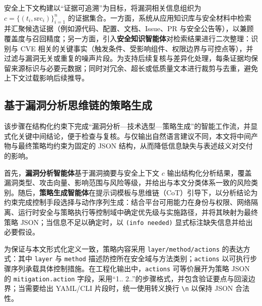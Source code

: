 安全上下文构建以“证据可追溯”为目标，将漏洞相关信息组织为 $c=\{(t_i,\text{src}_i)\}_{i=1}^{n}$ 的证据集合。一方面，系统从应用知识库与安全材料中检索并汇聚候选证据（例如源代码、配置、文档、Issue、PR 与安全公告等），以兼顾覆盖度与召回精度；另一方面，引入\textbf{安全知识智能体}对检索结果进行二次整理：识别与 CVE 相关的关键事实（触发条件、受影响组件、权限边界与可控点等），并过滤与漏洞无关或重复的噪声片段。为支持后续复核与差异化处理，每条证据均保留来源标识与必要元数据；同时对冗余、超长或低质量文本进行裁剪与去重，避免上下文过载影响后续推导。

\subsection{基于漏洞分析思维链的策略生成}

该步骤在结构化约束下完成“漏洞分析—技术选型—策略生成”的智能工作流，并显式化关键中间结论，便于检查与复核。与仅输出自然语言建议不同，本文将中间产物与最终策略均约束为固定的 JSON 结构，从而降低信息缺失与表述歧义对交付的影响。

首先，\textbf{漏洞分析智能体}基于漏洞摘要与安全上下文 $c$ 输出结构化分析结果，覆盖漏洞类型、攻击向量、影响范围与风险等级，并给出与本文分类体系一致的风险类别。随后，\textbf{策略生成智能体}在提示词模板与思维链（CoT）引导下，以分析结论为约束完成控制手段选择与动作序列生成：结合平台可用能力在身份与权限、网络隔离、运行时安全与策略执行等控制域中确定优先级与实施路径，并将其映射为最终策略 JSON；当信息不足以确定时，以 \texttt{(info needed)} 显式标注缺失信息并给出必要假设。

为保证与本文形式化定义一致，策略内容采用 \texttt{layer/method/actions} 的表达方式：其中 \texttt{layer} 与 \texttt{method} 描述防控所在安全域与方法类别；\texttt{actions} 以可执行步骤序列承载具体控制措施。在工程化输出中，\texttt{actions} 可等价展开为策略 JSON 的 \texttt{mitigation.action} 字段，采用“1.. 2..”的步骤格式，并包含验证要点与回滚边界；当需要给出 YAML/CLI 片段时，统一使用转义换行 \texttt{\textbackslash n} 以保持 JSON 合法性。

